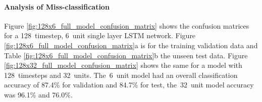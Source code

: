 \paragraph{Analysis of Miss-classification}
Figure \ref{fig:128x6_full_model_confusion_matrix} shows the confusion matrices for a 128~timestep, 6~unit single layer LSTM network. Figure \ref{fig:128x6_full_model_confusion_matrix}a is for the training validation data and Table \ref{fig:128x6_full_model_confusion_matrix}b the unseen test data. Figure \ref{fig:128x32_full_model_confusion_matrix} shows the same for a model with 128~timesteps and 32~units. The~6~unit model had an overall classification accuracy of 87.4\% for validation and 84.7\% for test, the~32~unit model accuracy was 96.1\% and 76.0\%.%


